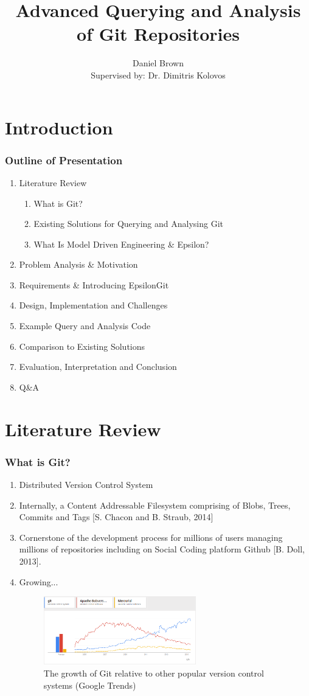 \documentclass[aspectratio=1610]{beamer}
\title[EpsilonGit]{Advanced Querying and Analysis of Git Repositories}
\author[Daniel Brown]{Daniel Brown\\{\footnotesize Supervised by: Dr. Dimitris Kolovos}}
\institute[UoY, CS]{The University of York, Department of Computer Science}
\date{\displaydate{date}}
\begin{document}
\frame{\titlepage}

\section{Introduction} %
\begin{frame}
	\frametitle{Outline of Presentation}
	\begin{enumerate}
		\item Literature Review \begin{enumerate}
									\item What is Git?
									\item Existing Solutions for Querying and Analysing Git
									\item What Is Model Driven Engineering \& Epsilon?
								\end{enumerate} 
		\item Problem Analysis \& Motivation
		\item Requirements \& Introducing EpsilonGit
		\item Design, Implementation and Challenges
		\item Example Query and Analysis Code
		\item Comparison to Existing Solutions
		\item Evaluation, Interpretation and Conclusion
		\item Q\&A
	\end{enumerate}
\end{frame}

\section{Literature Review}
\begin{frame}
	\frametitle{What is Git?}
	\begin{enumerate}
		\item Distributed Version Control System
		\item Internally, a Content Addressable Filesystem comprising of Blobs, Trees, Commits and Tags [S. Chacon and B. Straub, 2014]
		\item Cornerstone of the development process for millions of users managing millions of repositories including on Social Coding platform Github [B. Doll, 2013].
		\item Growing...
	\begin{figure}[H]
		\centering
		\includegraphics[width=250px]{images/git-google-trends.png}
		\caption{The growth of Git relative to other popular version control systems (Google Trends)}
	\end{figure}
	\end{enumerate}
\end{frame}
\end{document}
